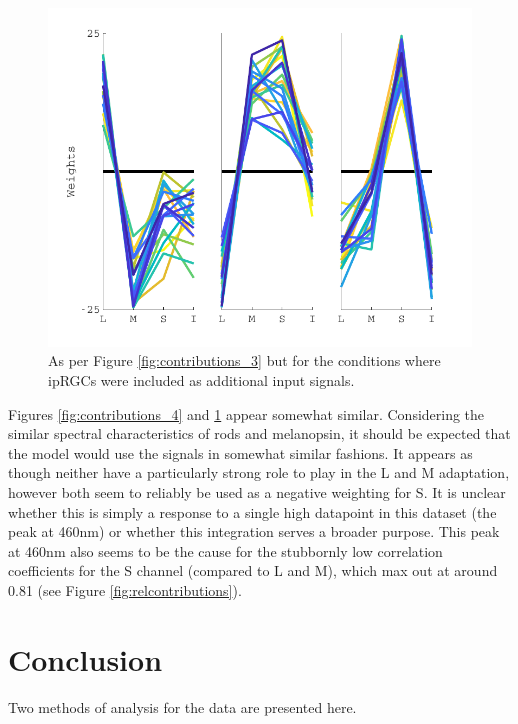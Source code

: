 \begin{figure}[htbp]
\includegraphics[max width=\textwidth]{figs/LargeSphere/contributions_5minusrods.pdf}
\caption{As per Figure \ref{fig:contributions_3} but for the conditions where ipRGCs were included as additional input signals.} 
\label{fig:contributions_5minusrods}
\end{figure}

Figures \ref{fig:contributions_4} and \ref{fig:contributions_5minusrods} appear somewhat similar. Considering the similar spectral characteristics of rods and melanopsin, it should be expected that the model would use the signals in somewhat similar fashions. It appears as though neither have a particularly strong role to play in the L and M adaptation, however both seem to reliably be used as a negative weighting for S. It is unclear whether this is simply a response to a single high datapoint in this dataset (the peak at 460nm) or whether this integration serves a broader purpose. This peak at 460nm also seems to be the cause for the stubbornly low correlation coefficients for the S channel (compared to L and M), which max out at around 0.81 (see Figure \ref{fig:relcontributions}). 

\clearpage

\section{Conclusion}

Two methods of analysis for the \citet{macdonald_chromatic_2013} data are presented here.

